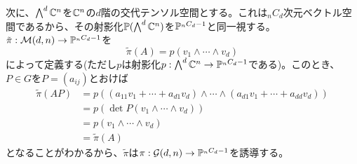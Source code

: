 \documentclass{ltjsreport}
\begin{document}
次に、$\bigwedge^d\mathbb{C}^n$を$\mathbb{C}^n$の$d$階の交代テンソル空間とする。これは$_nC_d$次元ベクトル空間であるから、その射影化$\mathbb{P}(\bigwedge^d\mathbb{C}^n)$を$\mathbb{P}^{_nC_d-1}$と同一視する。$\tilde{\pi}:\mathcal{M}(d,n)\rightarrow \mathbb{P}^{_{n}C_{d}-1}$を
\[
\tilde{\pi}(A)=p(v_1\wedge \cdots\wedge v_d)  
\]
によって定義する(ただし$p$は射影化$p:\bigwedge^d\mathbb{C}^n\rightarrow \mathbb{P}^{_{n}C_{d}-1}$である)。このとき、$P\in G$を$P=(a_{ij})$とおけば
\begin{align*}
  \tilde{\pi}(AP)
  &=p\left(
    (a_{11}v_1+\cdots+a_{d1}v_d)\wedge\cdots\wedge
    (a_{d1}v_1+\cdots+a_{dd}v_d)
  \right)\\
  &=p(\det P(v_1\wedge\cdots\wedge v_d))\\
  &=p(v_1\wedge\cdots\wedge v_d)\\
  &=\tilde{\pi}(A)
\end{align*}
となることがわかるから、$\tilde{\pi}$は$\pi:\mathcal{G}(d,n)\rightarrow \mathbb{P}^{_{n}C_{d}-1}$を誘導する。
\end{document}

